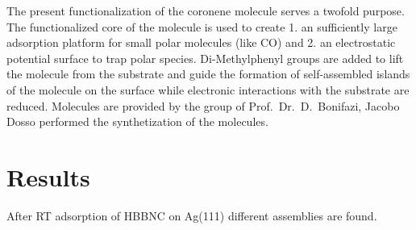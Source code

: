 The present functionalization of the coronene molecule serves a twofold purpose. The functionalized core of the molecule is used to create 1. an sufficiently large adsorption platform for small polar molecules (like CO) and 2. an electrostatic potential surface to trap polar species. 
Di-Methylphenyl groups are added to lift the molecule from the substrate and guide the formation of self-assembled islands of the molecule on the surface while electronic interactions with the substrate are reduced. Molecules are provided by the group of Prof.\ Dr.\ D.\ Bonifazi, Jacobo Dosso performed the synthetization of the molecules. 

\section{Results}
After RT adsorption of HBBNC on Ag(111) different assemblies are found. 
